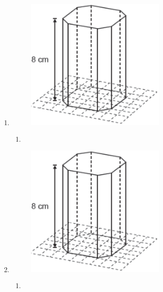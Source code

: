 \documentclass[twocolumn,oneside,a4paper,12.0pt]{article}
\begin{document}
\begin{enumerate}
\begin{enumerate}
\item 
\end{enumerate}




\item 

	\begin{figure}[!htb]
	\center
	\includegraphics[width=7cm]{Extras/v3.png}
	\end{figure}


\begin{enumerate}
\item 
\end{enumerate}




\item 

	\begin{figure}[!htb]
	\center
	\includegraphics[width=7cm]{Extras/v3.png}
	\end{figure}


\begin{enumerate}
\item 
\end{enumerate}



\end{enumerate}
\end{document}
